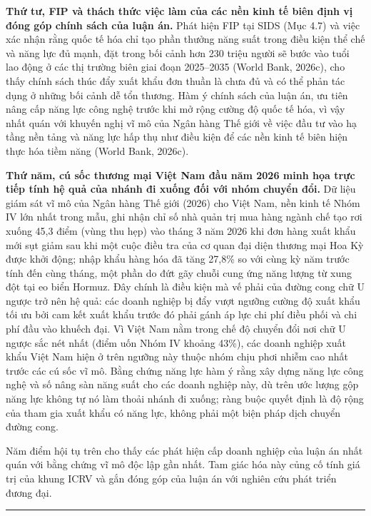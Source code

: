 \documentclass[
  a4paper,
  13pt]{extreport}
\begin{document}
\textbf{Thứ tư, FIP và thách thức việc làm của các nền kinh tế biên định
vị đóng góp chính sách của luận án.} Phát hiện FIP tại SIDS (Mục 4.7) và
việc xác nhận rằng quốc tế hóa chỉ tạo phần thưởng năng suất trong điều
kiện thể chế và năng lực đủ mạnh, đặt trong bối cảnh hơn 230 triệu người
sẽ bước vào tuổi lao động ở các thị trường biên giai đoạn 2025--2035
(World Bank, 2026c), cho thấy chính sách thúc đẩy xuất khẩu đơn thuần là
chưa đủ và có thể phản tác dụng ở những bối cảnh dễ tổn thương. Hàm ý
chính sách của luận án, ưu tiên nâng cấp năng lực công nghệ trước khi mở
rộng cường độ quốc tế hóa, vì vậy nhất quán với khuyến nghị vĩ mô của
Ngân hàng Thế giới về việc đầu tư vào hạ tầng nền tảng và năng lực hấp
thụ như điều kiện để các nền kinh tế biên hiện thực hóa tiềm năng (World
Bank, 2026c).

\textbf{Thứ năm, cú sốc thương mại Việt Nam đầu năm 2026 minh họa trực
tiếp tính hệ quả của nhánh đi xuống đối với nhóm chuyển đổi.} Dữ liệu
giám sát vĩ mô của Ngân hàng Thế giới (2026) cho Việt Nam, nền kinh tế
Nhóm IV lớn nhất trong mẫu, ghi nhận chỉ số nhà quản trị mua hàng ngành
chế tạo rơi xuống 45,3 điểm (vùng thu hẹp) vào tháng 3 năm 2026 khi đơn
hàng xuất khẩu mới sụt giảm sau khi một cuộc điều tra của cơ quan đại
diện thương mại Hoa Kỳ được khởi động; nhập khẩu hàng hóa đã tăng 27,8\%
so với cùng kỳ năm trước tính đến cùng tháng, một phần do đứt gãy chuỗi
cung ứng năng lượng từ xung đột tại eo biển Hormuz. Đây chính là điều
kiện mà vế phải của đường cong chữ U ngược trở nên hệ quả: các doanh
nghiệp bị đẩy vượt ngưỡng cường độ xuất khẩu tối ưu bởi cam kết xuất
khẩu trước đó phải gánh áp lực chi phí điều phối và chi phí đầu vào
khuếch đại. Vì Việt Nam nằm trong chế độ chuyển đổi nơi chữ U ngược sắc
nét nhất (điểm uốn Nhóm IV khoảng 43\%), các doanh nghiệp xuất khẩu Việt
Nam hiện ở trên ngưỡng này thuộc nhóm chịu phơi nhiễm cao nhất trước các
cú sốc vĩ mô. Bằng chứng năng lực hàm ý rằng xây dựng năng lực công nghệ
và số nâng sàn năng suất cho các doanh nghiệp này, dù trên ước lượng gộp
năng lực không tự nó làm thoải nhánh đi xuống; ràng buộc quyết định là
độ rộng của tham gia xuất khẩu có năng lực, không phải một biện pháp
dịch chuyển đường cong.

Năm điểm hội tụ trên cho thấy các phát hiện cấp doanh nghiệp của luận án
nhất quán với bằng chứng vĩ mô độc lập gần nhất. Tam giác hóa này củng
cố tính giá trị của khung ICRV và gắn đóng góp của luận án với nghiên
cứu phát triển đương đại.

\begin{center}\rule{0.5\linewidth}{0.5pt}\end{center}
\end{document}
